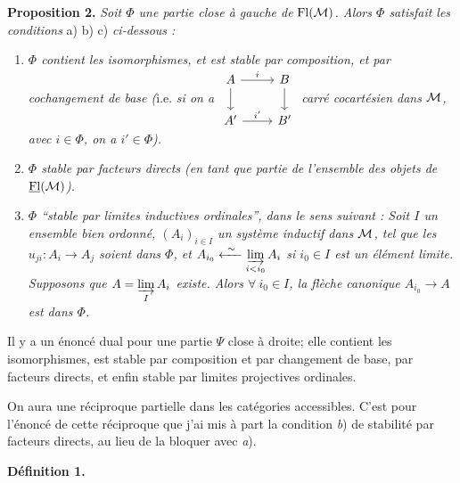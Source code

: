 \noindent\textbf{Proposition 2.} \textit{Soit $\Phi$ une partie close à gauche de} $\mathrm{Fl}(\mathcal{M})$\textit{. Alors $\Phi$ satisfait les conditions} a) b) c) \textit{ci-dessous :}

\begin{enumerate}[label={}]
\item[a)] \textit{$\Phi$ contient les isomorphismes, et est stable par composition, et par cochangement de base (}i.e. \textit{si on a}
$\vcenter{\hbox{\begin{tikzcd}
A \arrow[r, "i"] \arrow[d] & B \arrow[d] \\
A' \arrow[r, "i'"] & B'
\end{tikzcd}}}$
\textit{carré cocartésien dans $\mathcal{M}$, avec $i \in \Phi$, on a $i' \in \Phi$).}

\item[b)] \textit{$\Phi$ stable par facteurs directs (en tant que partie de l'ensemble des objets de} $\underline{\mathrm{Fl}}(\mathcal{M})$\textit{).}

\item[c)] \textit{$\Phi$ ``stable par limites inductives ordinales'', dans le sens suivant : Soit $I$ un ensemble bien ordonné, $(A_i)_{i \in I}$ un système inductif dans $\mathcal{M}$, tel que les $u_{ji} : A_i \longrightarrow A_j$ soient dans $\Phi$, et $A_{i_0} \xleftarrow{\ \sim\ } \varinjlim\limits_{i<i_0} A_i$ si $i_0 \in I$ est un élément limite. Supposons que $A = \varinjlim\limits_{I} A_i$ existe. Alors $\forall\ i_0 \in I$, la flèche canonique $A_{i_0} \longrightarrow A$ est dans $\Phi$.}
\end{enumerate}

Il y a un énoncé dual pour une partie $\Psi$ close à droite; elle contient les isomorphismes, est stable par composition et par changement de base, par facteurs directs, et enfin stable par limites projectives ordinales.


On aura une réciproque partielle dans les catégories accessibles. C'est pour l'énoncé de cette réciproque que j'ai mis à part la condition \textit{b}) de stabilité par facteurs directs, au lieu de la bloquer avec \textit{a}).

\noindent\textbf{Définition 1.}

